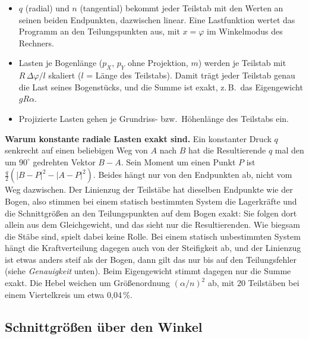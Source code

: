 \begin{itemize}
  \item $q$ (radial) und $n$ (tangential) bekommt jeder Teilstab mit den Werten an seinen beiden
        Endpunkten, dazwischen linear. Eine Lastfunktion wertet das Programm an den
        Teilungspunkten aus, mit $x = \varphi$ im Winkelmodus des Rechners.
  \item Lasten je Bogenlänge ($p_X$, $p_Y$ ohne Projektion, $m$) werden je Teilstab mit
        $R\,\Delta\varphi / l$ skaliert ($l$ = Länge des Teilstabs). Damit trägt jeder Teilstab genau
        die Last seines Bogenstücks, und die Summe ist exakt, z.\,B.\ das Eigengewicht $gR\alpha$.
  \item Projizierte Lasten gehen je Grundriss- bzw.\ Höhenlänge des Teilstabs ein.
\end{itemize}

\textbf{Warum konstante radiale Lasten exakt sind.} Ein konstanter Druck $q$ senkrecht auf einen
beliebigen Weg von $A$ nach $B$ hat die Resultierende $q$ mal den um $90^\circ$ gedrehten Vektor
$B - A$. Sein Moment um einen Punkt $P$ ist $\frac q2\left(|B-P|^2 - |A-P|^2\right)$. Beides hängt nur
von den Endpunkten ab, nicht vom Weg dazwischen. Der Linienzug der Teilstäbe hat dieselben Endpunkte
wie der Bogen, also stimmen bei einem statisch bestimmten System die Lagerkräfte und die
Schnittgrößen an den Teilungspunkten auf dem Bogen exakt: Sie folgen dort allein aus dem
Gleichgewicht, und das sieht nur die Resultierenden. Wie biegsam die Stäbe sind, spielt dabei keine
Rolle. Bei einem statisch unbestimmten System hängt die Kraftverteilung dagegen auch von der
Steifigkeit ab, und der Linienzug ist etwas anders steif als der Bogen, dann gilt das nur bis auf
den Teilungsfehler (siehe \emph{Genauigkeit} unten).
Beim Eigengewicht stimmt dagegen nur die Summe exakt. Die Hebel weichen um Größenordnung
$(\alpha/n)^2$ ab, mit 20 Teilstäben bei einem Viertelkreis um etwa 0,04\,\%.

\subsection{Schnittgrößen über den Winkel}

